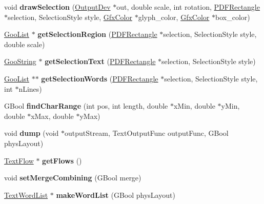 \begin{DoxyCompactItemize}
void {\bfseries draw\+Selection} (\hyperlink{class_output_dev}{Output\+Dev} $\ast$out, double scale, int rotation, \hyperlink{class_p_d_f_rectangle}{P\+D\+F\+Rectangle} $\ast$selection, Selection\+Style style, \hyperlink{struct_gfx_color}{Gfx\+Color} $\ast$glyph\+\_\+color, \hyperlink{struct_gfx_color}{Gfx\+Color} $\ast$box\+\_\+color)
\item 
\mbox{\label{class_text_page_a5c0da176a7c394d9b5e6e443fa059db8}} 
\hyperlink{class_goo_list}{Goo\+List} $\ast$ {\bfseries get\+Selection\+Region} (\hyperlink{class_p_d_f_rectangle}{P\+D\+F\+Rectangle} $\ast$selection, Selection\+Style style, double scale)
\item 
\mbox{\label{class_text_page_ac06b904834b04e20e6700c6f78b5b6d0}} 
\hyperlink{class_goo_string}{Goo\+String} $\ast$ {\bfseries get\+Selection\+Text} (\hyperlink{class_p_d_f_rectangle}{P\+D\+F\+Rectangle} $\ast$selection, Selection\+Style style)
\item 
\mbox{\label{class_text_page_af1b3bd675253be46dcf7dd3f0ad9c836}} 
\hyperlink{class_goo_list}{Goo\+List} $\ast$$\ast$ {\bfseries get\+Selection\+Words} (\hyperlink{class_p_d_f_rectangle}{P\+D\+F\+Rectangle} $\ast$selection, Selection\+Style style, int $\ast$n\+Lines)
\item 
\mbox{\label{class_text_page_a97751bf04df88c29c0acc466b8224f3b}} 
G\+Bool {\bfseries find\+Char\+Range} (int pos, int length, double $\ast$x\+Min, double $\ast$y\+Min, double $\ast$x\+Max, double $\ast$y\+Max)
\item 
\mbox{\label{class_text_page_a4184fdfdb74d93c7200c8773606d50df}} 
void {\bfseries dump} (void $\ast$output\+Stream, Text\+Output\+Func output\+Func, G\+Bool phys\+Layout)
\item 
\mbox{\label{class_text_page_a701de57e7959b028a15017d800439d08}} 
\hyperlink{class_text_flow}{Text\+Flow} $\ast$ {\bfseries get\+Flows} ()
\item 
\mbox{\label{class_text_page_a4bd8b626685df54eec184bea6ce03a6f}} 
void {\bfseries set\+Merge\+Combining} (G\+Bool merge)
\item 
\mbox{\label{class_text_page_a6446e4cb1f8f072e1a2c10920c8b14bb}} 
\hyperlink{class_text_word_list}{Text\+Word\+List} $\ast$ {\bfseries make\+Word\+List} (G\+Bool phys\+Layout)
\end{DoxyCompactItemize}

